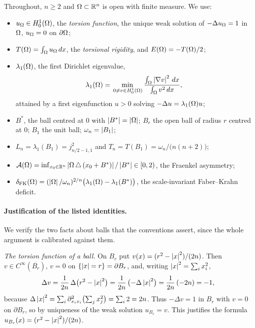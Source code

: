 Throughout, $n\ge 2$ and $\Omega\subset\mathbb R^n$ is open with finite measure. We
use:
\begin{itemize}
\item $u_\Omega\in H^1_0(\Omega)$, the \emph{torsion function}, the unique weak
solution of $-\Delta u_\Omega=1$ in $\Omega$, $u_\Omega=0$ on $\partial\Omega$;
\item $T(\Omega)=\int_\Omega u_\Omega\,dx$, the \emph{torsional rigidity}, and
$E(\Omega)=-T(\Omega)/2$;
\item $\lambda_1(\Omega)$, the first Dirichlet eigenvalue,
\begin{equation}\label{eq:rayleigh}
  \lambda_1(\Omega)=\min_{\,0\ne v\in H^1_0(\Omega)}
  \frac{\int_\Omega\left|\nabla v\right|^2\,dx}{\int_\Omega v^2\,dx},
\end{equation}
attained by a first eigenfunction $u>0$ solving $-\Delta u=\lambda_1(\Omega)u$;
\item $B^*$, the ball centred at $0$ with $\left|B^*\right|=\left|\Omega\right|$; $B_r$ the
open ball of radius $r$ centred at $0$; $B_1$ the unit ball;
$\omega_n=\left|B_1\right|$;
\item $L_n=\lambda_1(B_1)=j_{n/2-1,1}^2$ and
$T_n=T(B_1)=\omega_n/\bigl(n(n+2)\bigr)$;
\item $\mathcal A(\Omega)=\inf_{x_0\in\mathbb R^n}\left|\Omega\,\triangle\,(x_0+B^*)\right|/\left|B^*\right|
\in[0,2)$, the Fraenkel asymmetry;
\item $\delta_{\mathrm{FK}}(\Omega)
=(\left|\Omega\right|/\omega_n)^{2/n}\bigl(\lambda_1(\Omega)-\lambda_1(B^*)\bigr)$, the
scale-invariant Faber--Krahn deficit.
\end{itemize}

\paragraph{Justification of the listed identities.}
We verify the two facts about balls that the conventions assert, since the
whole argument is calibrated against them.

\emph{The torsion function of a ball.} On $B_r$ put
$v(x)=(r^2-\left|x\right|^2)/(2n)$. Then $v\in C^\infty(\overline{B_r})$, $v=0$ on
$\{\left|x\right|=r\}=\partial B_r$, and, writing $\left|x\right|^2=\sum_{i}x_i^2$,
\[
  \Delta v=\frac{1}{2n}\,\Delta\bigl(r^2-\left|x\right|^2\bigr)
  =\frac{1}{2n}\,\bigl(-\Delta\left|x\right|^2\bigr)
  =\frac{1}{2n}\,(-2n)=-1,
\]
because $\Delta\left|x\right|^2=\sum_i\partial_{x_ix_i}^2\bigl(\sum_j x_j^2\bigr)
=\sum_i 2=2n$. Thus $-\Delta v=1$ in $B_r$ with $v=0$ on $\partial B_r$, so
by uniqueness of the weak solution $u_{B_r}=v$. This justifies the formula
$u_{B_r}(x)=(r^2-\left|x\right|^2)/(2n)$.


